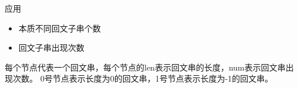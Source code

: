 应用
\begin{itemize}
    \item 本质不同回文子串个数
    \item 回文子串出现次数
\end{itemize}
每个节点代表一个回文串，每个节点的len表示回文串的长度，num表示回文串出现次数。
0号节点表示长度为0的回文串，1号节点表示长度为-1的回文串。